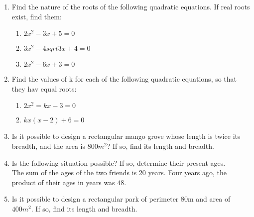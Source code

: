 \begin{enumerate}
\item Find the nature of the roots of the following quadratic equations. If real roots exist, find them:
\begin{enumerate}[label=(\roman*)]
\item $2x^2-3x+5=0$
\item $3x^2-4 sqrt 3x+4=0$
\item $2x^2-6x+3=0$
\end{enumerate}
\item Find the values of k for each of the following quadratic equations, so that they hav equal roots:
\begin{enumerate}[label=(\roman*)]
\item $2x^2=kx-3=0$
\item $kx(x-2)+6=0$
\end{enumerate}
\item Is it possible to design a rectangular mango grove whose length is twice its breadth, and the area is  $800m^2$? If so, find its length and breadth.
\item Is the following situation possible? If so, determine their present ages.
\\ The sum of the ages of the two friends is 20 years. Four years ago, the product of their ages in years was $48$.
\item Is it possible to design a rectangular park of perimeter 80m and area of $400m^2$. If so, find its length and breadth.
\end{enumerate}


